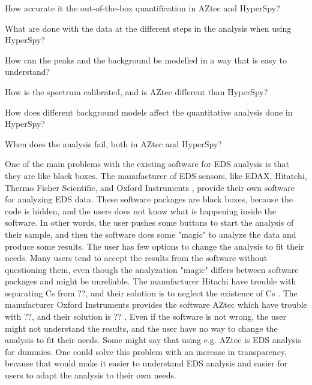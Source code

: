 \begin{subprob} \label{subproblem1}
    How accurate it the out-of-the-box quantification in AZtec and HyperSpy?
\end{subprob}
\begin{subprob} \label{subproblem2}
    What are done with the data at the different steps in the analysis when using HyperSpy?
\end{subprob}
\begin{subprob} \label{subproblem3}
    How can the peaks and the background be modelled in a way that is easy to understand?
\end{subprob}
\begin{subprob} \label{subproblem4}
    How is the spectrum calibrated, and is AZtec different than HyperSpy?
\end{subprob}
\begin{subprob} \label{subproblem5}
    How does different background models affect the quantitative analysis done in HyperSpy?
\end{subprob}
\begin{subprob} \label{subproblem6}
    When does the analysis fail, both in AZtec and HyperSpy?
\end{subprob}


%
%


One of the main problems with the existing software for EDS analysis is that they are like black boxes.
The manufacturer of EDS sensors, like EDAX, Hitatchi, Thermo Fisher Scientific, and Oxford Instruments , provide their own software for analyzing EDS data.
These software packages are black boxes, because the code is hidden, and the users does not know what is happening inside the software.
In other words, the user pushes some buttons to start the analysis of their sample, and then the software does some "magic" to analyze the data and produce some results.
The user has few options to change the analysis to fit their needs.
Many users tend to accept the results  from the software without questioning them, even though the analyzation "magic" differs between software packages and might be unreliable.
The manufacturer Hitachi have trouble with separating Cs from ??, and their solution is to neglect the existence of Cs .
The manufacturer Oxford Instruments provides the software AZtec which have trouble with ??, and their solution is ?? .
Even if the software is not wrong, the user might not understand the results, and the user have no way to change the analysis to fit their needs.
Some might say that using e.g. AZtec is EDS analysis for dummies.
One could solve this problem with an increase in transparency, because that would make it easier to understand EDS analysis and easier for users to adapt the analysis to their own needs.



